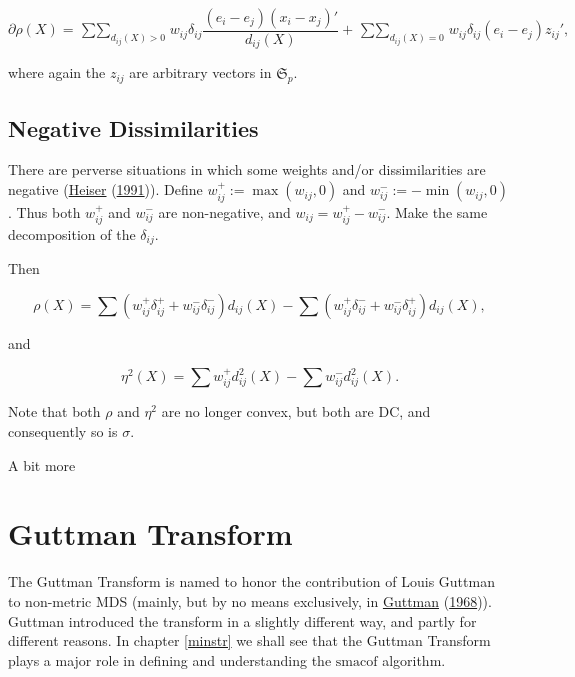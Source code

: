 \documentclass[
  12pt,
]{book}
\theoremstyle{definition}
\theoremstyle{definition}
\theoremstyle{definition}
\theoremstyle{definition}
\theoremstyle{remark}
\begin{document}
\begin{equation}
\partial\rho(X)=\mathop{\sum\sum}_{d_{ij}(X)>0}w_{ij}\delta_{ij}\frac{(e_i-e_j)(x_i-x_j)'}{d_{ij}(X)}+\mathop{\sum\sum}_{d_{ij}(X)=0}w_{ij}\delta_{ij}(e_i-e_j)z_{ij}',
\label{eq:propsubdiffrho}
\end{equation}

where again the \(z_{ij}\) are arbitrary vectors in \(\mathfrak{S}_p\).

\hypertarget{propnegdis}{%
\subsection{Negative Dissimilarities}\label{propnegdis}}

There are perverse situations in which some weights and/or dissimilarities are negative (\protect\hyperlink{ref-heiser_91}{Heiser} (\protect\hyperlink{ref-heiser_91}{1991})). Define \(w_{ij}^+:=\max(w_{ij},0)\) and \(w_{ij}^-:=-\min(w_{ij},0)\). Thus both \(w_{ij}^+\) and \(w_{ij}^-\) are non-negative, and \(w_{ij}=w_{ij}^+-w_{ij}^-\). Make the same decomposition of the \(\delta_{ij}\).

Then

\begin{equation}
\rho(X)=\sum (w_{ij}^+\delta_{ij}^++w_{ij}^-\delta_{ij}^-)d_{ij}(X)-\sum(w_{ij}^+\delta_{ij}^-+w_{ij}^-\delta_{ij}^+)d_{ij}(X),
\label{eq:proprhoneg}
\end{equation}

and

\begin{equation}
\eta^2(X)=\sum w_{ij}^+d_{ij}^2(X)-\sum w_{ij}^-d_{ij}^2(X).
\label{eq:propetaneg}
\end{equation}

Note that both \(\rho\) and \(\eta^2\) are no longer convex, but both are DC, and consequently so is \(\sigma\).

A bit more

\hypertarget{propguttman}{%
\section{Guttman Transform}\label{propguttman}}

The Guttman Transform is named to honor the contribution of Louis Guttman to non-metric MDS (mainly, but by no means exclusively, in \protect\hyperlink{ref-guttman_68}{Guttman} (\protect\hyperlink{ref-guttman_68}{1968})). Guttman introduced the transform in a slightly different way, and partly for
different reasons. In chapter \ref{minstr} we shall see that the Guttman Transform plays a major role in defining and understanding the \(\textrm{smacof}\) algorithm.
\end{document}
